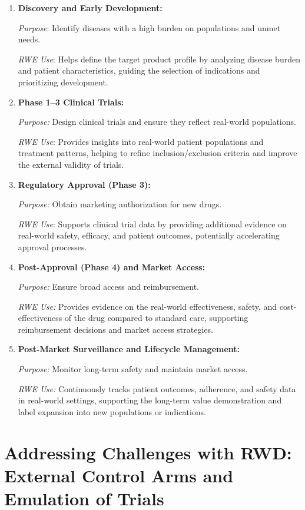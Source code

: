 \documentclass[
]{book}
\begin{document}
\begin{enumerate}
\def\labelenumi{\arabic{enumi}.}
\item
  \textbf{Discovery and Early Development:}

  \emph{Purpose}: Identify diseases with a high burden on populations and unmet needs.

  \emph{RWE Use}: Helps define the target product profile by analyzing disease burden and patient characteristics, guiding the selection of indications and prioritizing development.
\item
  \textbf{Phase 1--3 Clinical Trials:}

  \emph{Purpose:} Design clinical trials and ensure they reflect real-world populations.

  \emph{RWE Use}: Provides insights into real-world patient populations and treatment patterns, helping to refine inclusion/exclusion criteria and improve the external validity of trials.
\item
  \textbf{Regulatory Approval (Phase 3):}

  \emph{Purpose:} Obtain marketing authorization for new drugs.

  \emph{RWE Use}: Supports clinical trial data by providing additional evidence on real-world safety, efficacy, and patient outcomes, potentially accelerating approval processes.
\item
  \textbf{Post-Approval (Phase 4) and Market Access:}

  \emph{Purpose:} Ensure broad access and reimbursement.

  \emph{RWE Use:} Provides evidence on the real-world effectiveness, safety, and cost-effectiveness of the drug compared to standard care, supporting reimbursement decisions and market access strategies.
\item
  \textbf{Post-Market Surveillance and Lifecycle Management:}

  \emph{Purpose:} Monitor long-term safety and maintain market access.

  \emph{RWE Use:} Continuously tracks patient outcomes, adherence, and safety data in real-world settings, supporting the long-term value demonstration and label expansion into new populations or indications.
\end{enumerate}

\section{Addressing Challenges with RWD: External Control Arms and Emulation of Trials}\label{addressing-challenges-with-rwd-external-control-arms-and-emulation-of-trials}
\end{document}
